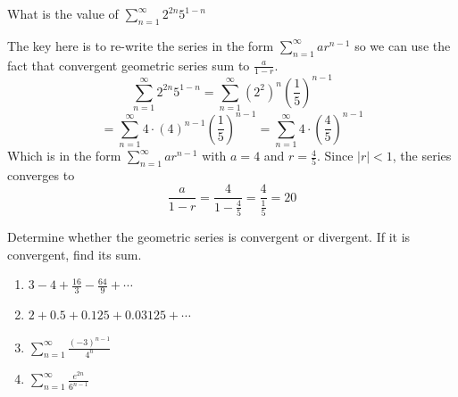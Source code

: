 \begin{Worked}
\begin{Problem}
What is the value of $\sum_{n=1}^\infty 2^{2n}5^{1-n}$
\end{Problem}
\begin{Solution}
The key here is to re-write the series in the form $\sum_
{n=1}^\infty ar^{n -1}$ so we can use the fact that convergent geometric 
series sum to $\frac{a}{1-r}$. 
$$\sum_{n=1}^\infty 2^{2n}5^{1-n} = \sum_{n=1}^\infty \left( 2^2 \right)^n 
\left( \frac{1}{5} \right)^{n-1}$$
$$= \sum_{n=1}^\infty 4 \cdot \left( 4 \right)^{n-1} \left( \frac{1}{5} 
\right)^{n-1} = \sum_{n=1}^\infty 4 \cdot \left( \frac{4}{5} \right)^{n-1}$$
Which is in the form $\sum_{n=1}^\infty ar^{n -1}$ with $a=4$ and $r=
\frac{4}{5}$. Since $|r| < 1$, the series converges to 
$$\frac{a}{1-r} = \frac{4}{1-\frac{4}{5}} = \frac{4}{\frac{1}{5}} = 20$$
\end{Solution}
\end{Worked}

\begin{Exercise}[label=geo1]
Determine whether the geometric series is convergent or divergent. If it is 
convergent, find its sum.
\begin{enumerate}
\item $3 - 4 + \frac{16}{3} - \frac{64}{9} + \cdots$
\item $2 + 0.5 + 0.125 + 0.03125 + \cdots$
\item $\sum_{n=1}^\infty \frac{(-3)^{n-1}}{4^n}$
\item $\sum_{n=1}^\infty \frac{e^{2n}}{6^{n-1}}$
\end{enumerate}
\end{Exercise}

